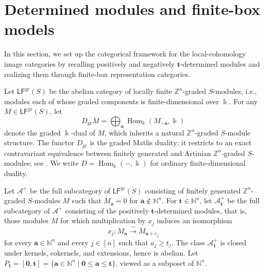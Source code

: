 \documentclass[12pt,reqno]{amsart}
\theoremstyle{definition}
\theoremstyle{remark}
\newcommand{\Hom}{\operatorname{Hom}}
\newcommand{\LFgr}{\mathsf{LF}^{\mathrm{gr}}(S)}
\newcommand{\Dgr}{D_{\mathrm{gr}}}
\begin{document}
\section{Determined modules and finite-box models}\label{sec:determined}
In this section, we set up the categorical framework for the local-cohomology image categories by recalling positively and negatively $\mathbf t$-determined modules and realizing them through finite-box representation categories.

Let $\LFgr$ be the abelian category of locally finite $\mathbb Z^n$-graded
$S$-modules, i.e., modules each of whose graded components is finite-dimensional over
$\Bbbk$. For any $M\in\LFgr$, let
\[
\Dgr M=\bigoplus_{\mathbf a}\Hom_\Bbbk(M_{-\mathbf a},\Bbbk)
\]
denote the graded $\Bbbk$-dual of $M$, which inherits a natural
$\mathbb Z^n$-graded $S$-module structure. The functor $\Dgr$ is the
graded Matlis duality; it restricts to an exact contravariant equivalence
between finitely generated and Artinian $\mathbb Z^n$-graded
$S$-modules; see \cite[Theorem~3.6.17]{BH}. We write
$D=\Hom_\Bbbk(-,\Bbbk)$ for ordinary finite-dimensional duality.

Let $\mathcal A^+$ be the full subcategory of $\LFgr$ consisting of finitely
generated $\mathbb Z^n$-graded $S$-modules $M$ such that
$M_{\mathbf a}=0$ for $\mathbf a\notin\mathbb N^n$.  For $\mathbf t\in\mathbb N^n$, let $\mathcal A^+_{\mathbf t}$ be the full
subcategory of $\mathcal A^+$ consisting of the positively
$\mathbf t$-determined modules, that is, those modules $M$ for which
multiplication by $x_j$ induces an isomorphism
\[
x_j:M_{\mathbf a}\xrightarrow{\sim}M_{\mathbf a+\varepsilon_j}
\]
for every $\mathbf a\in\mathbb N^n$ and every $j\in[n]$ such that
$a_j\ge t_j$.
The class $\mathcal A^+_{\mathbf t}$ is closed under kernels, cokernels, and
extensions, hence is abelian. Let $P_{\mathbf t}=[\mathbf0,\mathbf t]
=\{\mathbf a\in\mathbb N^n\mid \mathbf0\le\mathbf a\le\mathbf t\}$,
viewed as a subposet of $\mathbb N^n$.
\end{document}
